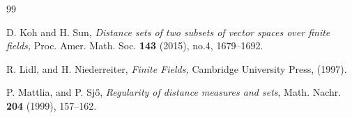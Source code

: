 \documentclass[a4paper,11pt]{amsart}
\numberwithin{equation}{section}
\begin{document}
\begin{thebibliography}{99}




D. Koh and H. Sun, \textit{Distance sets of two subsets of vector spaces over finite fields,} Proc. Amer. Math. Soc. \textbf{143} (2015), no.4, 1679--1692.



 R. Lidl, and H. Niederreiter, \textit{Finite Fields,} Cambridge University Press, (1997).







 P. Mattlia, and P. Sj\H{o}, \textit{Regularity of distance measures and sets}, Math. Nachr. \textbf{204} (1999), 157--162.



\end{thebibliography}
\end{document}
